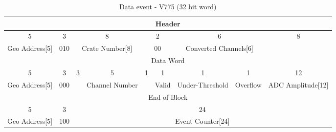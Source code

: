 \begin{landscape}
    \pagebreak
    
    \begin{table}[]
    \ContinuedFloat
    \begin{subtable}[]{1.3\textwidth}
    \centering
    \caption{\label{tab:word_CAEN}Data event - V775 (32 bit word)}
    \begin{tabular}{c|c|c|c|c|c|c|c|c|c|c|c|c|c|c|c|c|c|c|c|c|c|c|c|c|c|c|c|c|c|c|c}
        \toprule
        \multicolumn{32}{c}{Header} \\
        \hline
        \multicolumn{5}{c|}{5} & \multicolumn{3}{|c|}{3} & \multicolumn{8}{|c|}{8} & \multicolumn{2}{|c|}{2} & \multicolumn{6}{|c|}{6} & \multicolumn{8}{|c}{8} \\
        \hline
        \multicolumn{5}{c|}{Geo Address[5]} & \multicolumn{3}{|c|}{010} & \multicolumn{8}{|c|}{Crate Number[8]} & \multicolumn{2}{|c|}{00} & \multicolumn{6}{|c|}{Converted Channels[6]} & \multicolumn{8}{|c}{} \\
        \midrule
        \multicolumn{32}{c}{Data Word} \\
        \hline
        \multicolumn{5}{c|}{5} & \multicolumn{3}{|c|}{3} & \multicolumn{3}{|c|}{3} & \multicolumn{5}{|c|}{5} & 1 & 1 & 1 & 1 & \multicolumn{12}{|c}{12}\\
        \hline
        \multicolumn{5}{c|}{Geo Address[5]} & \multicolumn{3}{|c|}{000} & \multicolumn{3}{|c|}{} & \multicolumn{5}{|c|}{Channel Number} &  & Valid & Under-Threshold & Overflow & \multicolumn{12}{|c}{ADC Amplitude[12]}\\
        \midrule
        \multicolumn{32}{c}{End of Block} \\
        \hline
        \multicolumn{5}{c|}{5} & \multicolumn{3}{|c|}{3} & \multicolumn{24}{|c}{24} \\
        \hline
        \multicolumn{5}{c|}{Geo Address[5]} & \multicolumn{3}{|c|}{100} & \multicolumn{24}{|c}{Event Counter[24]} \\
        \bottomrule
    \end{tabular}
    \end{subtable}
    \end{table}
    
    \pagebreak
    

\end{landscape}
